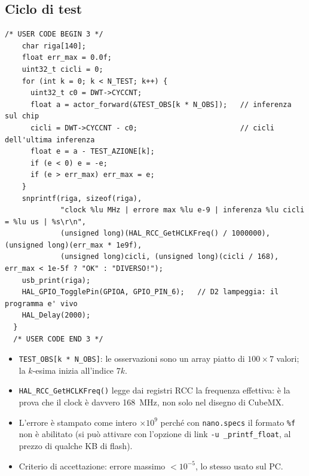\documentclass[11pt,a4paper]{article}
\newcommand{\code}[1]{\texttt{\small #1}}
\begin{document}
\subsection{Ciclo di test}
\begin{lstlisting}[style=c]
    /* USER CODE BEGIN 3 */
    char riga[140];
    float err_max = 0.0f;
    uint32_t cicli = 0;
    for (int k = 0; k < N_TEST; k++) {
      uint32_t c0 = DWT->CYCCNT;
      float a = actor_forward(&TEST_OBS[k * N_OBS]);   // inferenza sul chip
      cicli = DWT->CYCCNT - c0;                        // cicli dell'ultima inferenza
      float e = a - TEST_AZIONE[k];
      if (e < 0) e = -e;
      if (e > err_max) err_max = e;
    }
    snprintf(riga, sizeof(riga),
             "clock %lu MHz | errore max %lu e-9 | inferenza %lu cicli = %lu us | %s\r\n",
             (unsigned long)(HAL_RCC_GetHCLKFreq() / 1000000), (unsigned long)(err_max * 1e9f),
             (unsigned long)cicli, (unsigned long)(cicli / 168), err_max < 1e-5f ? "OK" : "DIVERSO!");
    usb_print(riga);
    HAL_GPIO_TogglePin(GPIOA, GPIO_PIN_6);   // D2 lampeggia: il programma e' vivo
    HAL_Delay(2000);
  }
  /* USER CODE END 3 */
\end{lstlisting}
\begin{itemize}
\item \code{TEST\_OBS[k * N\_OBS]}: le osservazioni sono un array piatto di $100\times7$ valori; la
  $k$-esima inizia all'indice $7k$.
\item \code{HAL\_RCC\_GetHCLKFreq()} legge dai registri RCC la frequenza effettiva: è la prova che il
  clock è davvero 168~MHz, non solo nel disegno di CubeMX.
\item L'errore è stampato come intero $\times10^9$ perché con \code{nano.specs} il formato \code{\%f}
  non è abilitato (si può attivare con l'opzione di link \code{-u \_printf\_float}, al prezzo di
  qualche KB di flash).
\item Criterio di accettazione: errore massimo $< 10^{-5}$, lo stesso usato sul PC.
\end{itemize}
\end{document}
